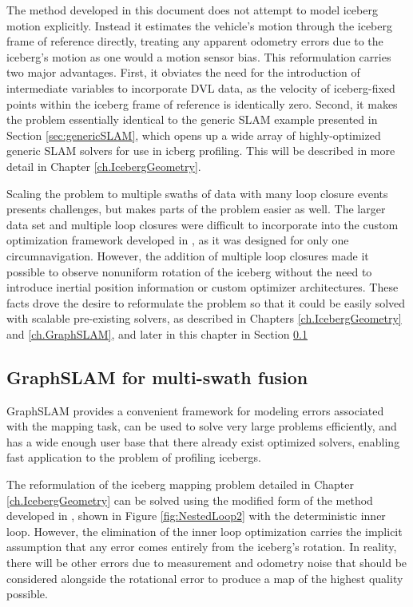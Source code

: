 The method developed in this document does not attempt to model iceberg motion explicitly. Instead it estimates the vehicle's motion through the iceberg frame of reference directly, treating any apparent odometry errors due to the iceberg's motion as one would a motion sensor bias. This reformulation carries two major advantages. First, it obviates the need for the introduction of intermediate variables to incorporate DVL data, as the velocity of iceberg-fixed points within the iceberg frame of reference is identically zero. Second, it makes the problem essentially identical to the generic SLAM example presented in Section \ref{sec:genericSLAM}, which opens up a wide array of highly-optimized generic SLAM solvers for use in icberg profiling. This will be described in more detail in Chapter \ref{ch.IcebergGeometry}.

Scaling the problem to multiple swaths of data with many loop closure events presents challenges, but makes parts of the problem easier as well. The larger data set and multiple loop closures were difficult to incorporate into the custom optimization framework developed in \cite{Kimball2011b}, as it was designed for only one circumnavigation. However, the addition of multiple loop closures made it possible to observe nonuniform rotation of the iceberg without the need to introduce inertial position information or custom optimizer architectures. These facts drove the desire to reformulate the problem so that it could be easily solved with scalable pre-existing solvers, as described in Chapters \ref{ch.IcebergGeometry} and \ref{ch.GraphSLAM}, and later in this chapter in Section \ref{sec.GraphSLAMmotivation}

\subsection{GraphSLAM for multi-swath fusion}
\label{sec.GraphSLAMmotivation}
GraphSLAM provides a convenient framework for modeling errors associated with the mapping task, can be used to solve very large problems efficiently, and has a wide enough user base that there already exist optimized solvers, enabling fast application to the problem of profiling icebergs.

The reformulation of the iceberg mapping problem detailed in Chapter \ref{ch.IcebergGeometry} can be solved using the modified form of the method developed in \cite{Kimball2011b}, shown in Figure \ref{fig:NestedLoop2} with the deterministic inner loop. However, the elimination of the inner loop optimization carries the implicit assumption that any error comes entirely from the iceberg's rotation. In reality, there will be other errors due to measurement and odometry noise that should be considered alongside the rotational error to produce a map of the highest quality possible. 

